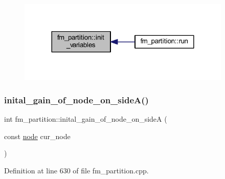 \begin{figure}[H]
\begin{center}
\leavevmode
\includegraphics[width=288pt]{classfm__partition_aad791ac648a9ff4694c8960f49dcc018_icgraph}
\end{center}
\end{figure}
\mbox{\label{classfm__partition_a50c61b9d27e83a98e2e04a47b51670b6}} 
\subsubsection{\texorpdfstring{inital\+\_\+gain\+\_\+of\+\_\+node\+\_\+on\+\_\+side\+A()}{inital\_gain\_of\_node\_on\_sideA()}}
{\footnotesize\ttfamily int fm\+\_\+partition\+::inital\+\_\+gain\+\_\+of\+\_\+node\+\_\+on\+\_\+sideA (\begin{DoxyParamCaption}\item[{const \mbox{\hyperlink{classnode}{node}}}]{cur\+\_\+node }\end{DoxyParamCaption})\hspace{0.3cm}{\ttfamily [protected]}}



Definition at line 630 of file fm\+\_\+partition.\+cpp.


